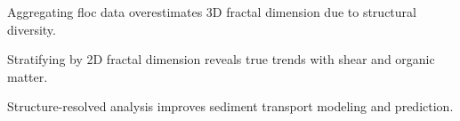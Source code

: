\documentclass{agujournal2019}
\begin{document}

\begin{keypoints}
\item Aggregating floc data overestimates 3D fractal dimension due to structural diversity.
\item Stratifying by 2D fractal dimension reveals true trends with shear and organic matter.
\item Structure-resolved analysis improves sediment transport modeling and prediction.
\end{keypoints}
\end{document}
